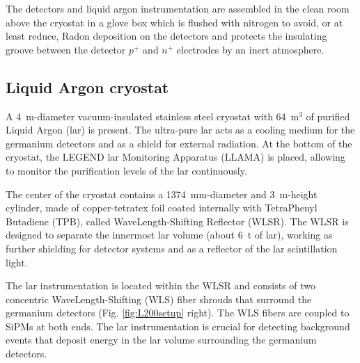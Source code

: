 The detectors and liquid argon instrumentation are assembled in the clean room above the cryostat in a glove box which is flushed with nitrogen to avoid, or at least reduce, Radon deposition on the detectors and protects the insulating groove between the detector $p^+$ and $n^+$ electrodes by an inert atmosphere. \cite{LEGEND:setup}

\subsection{Liquid Argon cryostat}
\label{subsec:LAR}
A 4~m-diameter vacuum-insulated stainless steel cryostat with 64~m$^3$ of purified Liquid Argon (\ac{lar}) is present. The ultra-pure \ac{lar} acts as a cooling medium for the germanium detectors and as a shield for external radiation. At the bottom of the cryostat, the LEGEND \ac{lar} Monitoring Apparatus (LLAMA) is placed, allowing to monitor the purification levels of the \ac{lar} continuously.

The center of the cryostat contains a 1374~mm-diameter and 3~m-height cylinder, made of copper-tetratex foil coated internally with TetraPhenyl Butadiene (TPB), called WaveLength-Shifting Reflector (WLSR). The WLSR is designed to separate the innermost \ac{lar} volume (about 6~t of \ac{lar}), working as further shielding for detector systems and as a reflector of the \ac{lar} scintillation light.

The \ac{lar} instrumentation is located within the WLSR and consists of two concentric WaveLength-Shifting (WLS) fiber shrouds that surround the germanium detectors (Fig. \ref{fig:L200setup} right). The WLS fibers are coupled to \ac{SiPMs} at both ends. The \ac{lar} instrumentation is crucial for detecting background events that deposit energy in the \ac{lar} volume surrounding the germanium detectors. \cite{LEGENDsetup-details}


